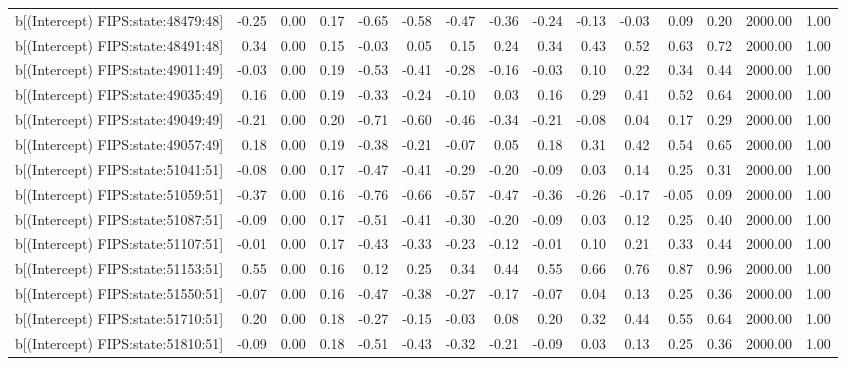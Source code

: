 \begin{table}[ht]
\begin{tabular}{rrrrrrrrrrrrrrr}
  b[(Intercept) FIPS:state:48479:48] & -0.25 & 0.00 & 0.17 & -0.65 & -0.58 & -0.47 & -0.36 & -0.24 & -0.13 & -0.03 & 0.09 & 0.20 & 2000.00 & 1.00 \\ 
  b[(Intercept) FIPS:state:48491:48] & 0.34 & 0.00 & 0.15 & -0.03 & 0.05 & 0.15 & 0.24 & 0.34 & 0.43 & 0.52 & 0.63 & 0.72 & 2000.00 & 1.00 \\ 
  b[(Intercept) FIPS:state:49011:49] & -0.03 & 0.00 & 0.19 & -0.53 & -0.41 & -0.28 & -0.16 & -0.03 & 0.10 & 0.22 & 0.34 & 0.44 & 2000.00 & 1.00 \\ 
  b[(Intercept) FIPS:state:49035:49] & 0.16 & 0.00 & 0.19 & -0.33 & -0.24 & -0.10 & 0.03 & 0.16 & 0.29 & 0.41 & 0.52 & 0.64 & 2000.00 & 1.00 \\ 
  b[(Intercept) FIPS:state:49049:49] & -0.21 & 0.00 & 0.20 & -0.71 & -0.60 & -0.46 & -0.34 & -0.21 & -0.08 & 0.04 & 0.17 & 0.29 & 2000.00 & 1.00 \\ 
  b[(Intercept) FIPS:state:49057:49] & 0.18 & 0.00 & 0.19 & -0.38 & -0.21 & -0.07 & 0.05 & 0.18 & 0.31 & 0.42 & 0.54 & 0.65 & 2000.00 & 1.00 \\ 
  b[(Intercept) FIPS:state:51041:51] & -0.08 & 0.00 & 0.17 & -0.47 & -0.41 & -0.29 & -0.20 & -0.09 & 0.03 & 0.14 & 0.25 & 0.31 & 2000.00 & 1.00 \\ 
  b[(Intercept) FIPS:state:51059:51] & -0.37 & 0.00 & 0.16 & -0.76 & -0.66 & -0.57 & -0.47 & -0.36 & -0.26 & -0.17 & -0.05 & 0.09 & 2000.00 & 1.00 \\ 
  b[(Intercept) FIPS:state:51087:51] & -0.09 & 0.00 & 0.17 & -0.51 & -0.41 & -0.30 & -0.20 & -0.09 & 0.03 & 0.12 & 0.25 & 0.40 & 2000.00 & 1.00 \\ 
  b[(Intercept) FIPS:state:51107:51] & -0.01 & 0.00 & 0.17 & -0.43 & -0.33 & -0.23 & -0.12 & -0.01 & 0.10 & 0.21 & 0.33 & 0.44 & 2000.00 & 1.00 \\ 
  b[(Intercept) FIPS:state:51153:51] & 0.55 & 0.00 & 0.16 & 0.12 & 0.25 & 0.34 & 0.44 & 0.55 & 0.66 & 0.76 & 0.87 & 0.96 & 2000.00 & 1.00 \\ 
  b[(Intercept) FIPS:state:51550:51] & -0.07 & 0.00 & 0.16 & -0.47 & -0.38 & -0.27 & -0.17 & -0.07 & 0.04 & 0.13 & 0.25 & 0.36 & 2000.00 & 1.00 \\ 
  b[(Intercept) FIPS:state:51710:51] & 0.20 & 0.00 & 0.18 & -0.27 & -0.15 & -0.03 & 0.08 & 0.20 & 0.32 & 0.44 & 0.55 & 0.64 & 2000.00 & 1.00 \\ 
  b[(Intercept) FIPS:state:51810:51] & -0.09 & 0.00 & 0.18 & -0.51 & -0.43 & -0.32 & -0.21 & -0.09 & 0.03 & 0.13 & 0.25 & 0.36 & 2000.00 & 1.00 \\ 

\end{tabular}
\end{table}
